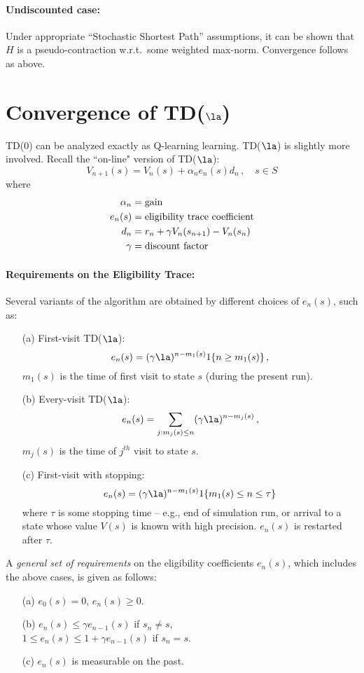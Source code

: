 \paragraph{Undiscounted case:}
Under appropriate ``Stochastic Shortest Path''
assumptions, it can be shown that $H$ is a pseudo-contraction w.r.t.\ some
weighted max-norm.
Convergence follows as above.


\section{Convergence of TD($\la$)}

TD(0) can be analyzed exactly as Q-learning learning.
TD($\la$) is slightly more involved.
Recall the ``on-line" version of TD($\la$):
$$
V_{n+1}(s)=V_n(s)+\alpha_n e_n(s)d_n\,,\quad s\in S
$$
where
\begin{align*}
\alpha_n & = \mbox{\rm gain} \\
e_n(s) & = \mbox{\rm eligibility trace coefficient}\\
d_n & = r_n + \gamma V_n(s_{n+1})-V_n(s_n)\\
\gamma& = \mbox{\rm discount factor}
\end{align*}

\paragraph{Requirements on the Eligibility Trace:}

Several variants of the algorithm are obtained by different choices
of $e_n(s)$, such as:
\begin{itemize}
\item[(a)] First-visit TD($\la$):
$$
e_n(s)=(\gamma\la)^{n-m_1(s)} 1\{n\ge m_1(s)\} \,,
$$
$m_1(s)$ is the time of first visit to state $s$ (during the present run).
\item[(b)] Every-visit TD($\la$):
$$
e_n(s)=\sum_{j:m_j(s)\le n}   (\gamma\la)^{n-m_j(s)} \,,
$$
$m_j(s)$ is the time of $j^{th}$ visit to state $s$.
\item[(c)]  First-visit with stopping:
$$
e_n(s)=(\gamma\la)^{n-m_1(s)} 1\{m_1(s)\le n \le \tau\}
$$
where $\tau$ is some stopping time -- e.g., end of simulation run, or arrival
to a state whose value $V(s)$ is known with high precision. $e_n(s)$ is
restarted after $\tau$.
\end{itemize}



A {\em general set of requirements} on the eligibility coefficients $e_n(s)$, which
includes the above cases, is given as follows:
\begin{itemize}
\item[(a)]
$e_0(s)= 0$, $e_n(s)\ge 0$.
\item[(b)]
$e_n(s)\le \gamma e_{n-1}(s)$ if $s_n\not= s$, \\
$1\le e_n(s)\le 1+ \gamma e_{n-1}(s)$ if $s_n= s$.
\item[(c)]
$e_n(s)$ is measurable on the past.
\end{itemize}

